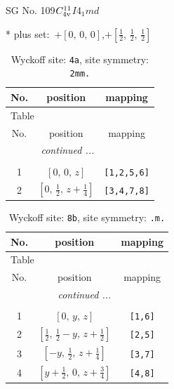\documentclass[fleqn,8pt]{jsarticle}
\begin{document}
\setcounter{MaxMatrixCols}{32}

\renewcommand{\tablename}{Table~}
\renewcommand{\figurename}{Figure~}
\begin{center}
\LARGE
SG No. 109\quad$C_{\rm 4v}^{11}$\quad$I4_1md$\quad[ tetragonal ]
\end{center}
* plus set:\,\,\,$+\left[ 0,\, 0,\, 0 \right]$,\quad $+\left[ \frac{1}{2},\, \frac{1}{2},\, \frac{1}{2} \right]$
\renewcommand{\arraystretch}{1.2}
\begin{longtable}{ccc}
\caption{Wyckoff site: {\tt 4a}, site symmetry: {\tt 2mm.}}
 \\
 \hline \hline
No. & position & mapping \\ \hline \endfirsthead

\multicolumn{2}{l}{\tablename\ \thetable{}} \\
 \hline \hline
No. & position & mapping \\ \hline \endhead

 \hline \hline
\multicolumn{2}{r}{\footnotesize\it continued ...} \\ \endfoot

 \hline \hline
\multicolumn{2}{r}{} \\ \endlastfoot

1 & $\left[ 0,\, 0,\, z \right]$ & {\tt [1,2,5,6]} \\ \hline
2 & $\left[ 0,\, \frac{1}{2},\, z + \frac{1}{4} \right]$ & {\tt [3,4,7,8]} \\
\end{longtable}
\renewcommand{\arraystretch}{1.2}
\begin{longtable}{ccc}
\caption{Wyckoff site: {\tt 8b}, site symmetry: {\tt .m.}}
 \\
 \hline \hline
No. & position & mapping \\ \hline \endfirsthead

\multicolumn{2}{l}{\tablename\ \thetable{}} \\
 \hline \hline
No. & position & mapping \\ \hline \endhead

 \hline \hline
\multicolumn{2}{r}{\footnotesize\it continued ...} \\ \endfoot

 \hline \hline
\multicolumn{2}{r}{} \\ \endlastfoot

1 & $\left[ 0,\, y,\, z \right]$ & {\tt [1,6]} \\ \hline
2 & $\left[ \frac{1}{2},\, \frac{1}{2} - y,\, z + \frac{1}{2} \right]$ & {\tt [2,5]} \\ \hline
3 & $\left[ - y,\, \frac{1}{2},\, z + \frac{1}{4} \right]$ & {\tt [3,7]} \\ \hline
4 & $\left[ y + \frac{1}{2},\, 0,\, z + \frac{3}{4} \right]$ & {\tt [4,8]} \\
\end{longtable}
\end{document}
